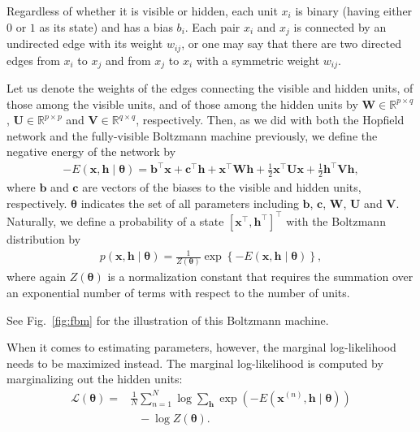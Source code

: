 \documentclass[dissertation,nocontribution,draft*]{aaltoseries}
\newcommand{\vect}[1]{\mathbf{#1}}
\newcommand{\vects}[1]{\boldsymbol{#1}}
\newcommand{\matr}[1]{\mathbf{#1}}
\newcommand{\vb}[0]{\vect{b}}
\newcommand{\vc}[0]{\vect{c}}
\newcommand{\vh}[0]{\vect{h}}
\newcommand{\vx}[0]{\vect{x}}
\newcommand{\mW}[0]{\matr{W}}
\newcommand{\mU}[0]{\matr{U}}
\newcommand{\mV}[0]{\matr{V}}
\newcommand{\TT}[0]{{\vects{\theta}}}
\newcommand{\RR}[0]{\mathbb{R}}
\newcommand{\LL}[0]{\mathcal{L}}
\begin{document}
Regardless of whether it is visible or hidden, each unit
$x_i$ is binary (having either $0$ or $1$ as its state) and
has a bias $b_i$.  Each pair $x_i$ and $x_j$ is connected by
an undirected edge with its weight $w_{ij}$, or one may say
that there are two directed edges from $x_i$ to $x_j$ and
from $x_j$ to $x_i$ with a symmetric weight $w_{ij}$. 

Let us denote the weights of the edges connecting 
the visible and hidden units, of those among the visible
units, and of those among the hidden units by $\mW \in
\RR^{p \times q}$, $\mU \in \RR^{p \times p}$ and $\mV \in
\RR^{q \times q}$, respectively. Then, as we did with both the Hopfield network
and the fully-visible Boltzmann machine previously, we define
the negative energy of the network by
\begin{align}
    \label{eq:bm_energy}
    -E(\vx, \vh \mid \TT) = \vb^\top \vx + \vc^\top \vh +
    \vx^\top \mW \vh + \frac{1}{2} \vx^\top \mU \vx +
    \frac{1}{2} \vh^\top \mV \vh,
\end{align}
where $\vb$ and $\vc$ are vectors of the biases to the
visible and hidden units, respectively. $\TT$ indicates the
set of all parameters including $\vb$, $\vc$, $\mW$, $\mU$
and $\mV$. Naturally, we define a probability of a state
$\left[ \vx^\top, \vh^\top \right]^\top$ with the Boltzmann
distribution by
\begin{align}
    \label{eq:bm_prob}
    p(\vx, \vh \mid \TT) = \frac{1}{Z(\TT)} \exp \left\{
    -E\left(\vx , \vh \mid \TT\right)
    \right\},
\end{align}
where again $Z(\TT)$ is a normalization constant that
requires the summation over an exponential number of terms
with respect to the number of units.

See Fig.~\ref{fig:fbm} for the illustration of this
Boltzmann machine.

When it comes to estimating parameters, however, the marginal
log-likelihood needs to be maximized instead. The marginal
log-likelihood is computed by marginalizing out the hidden
units:
\begin{align}
    \label{eq:bm_mll}
    \LL(\TT) =& \frac{1}{N} \sum_{n=1}^N \log \sum_{\vh}
    \exp\left(-E\left( \vx^{(n)}, \vh \mid \TT\right)\right)
    \nonumber
    \\
    &\phantom{\frac{1}{N}}- \log Z(\TT).
\end{align}
\end{document}
